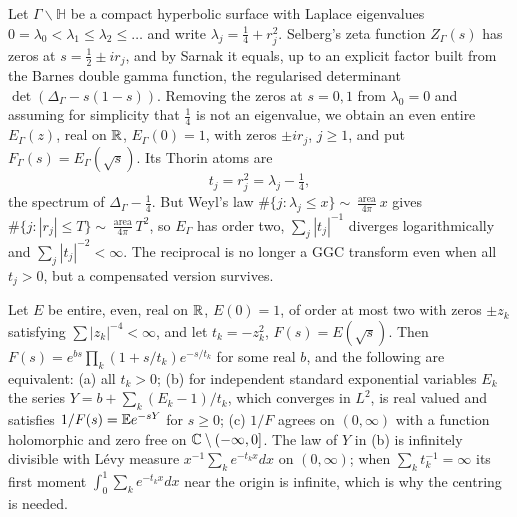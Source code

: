 Let $\Gamma\backslash\mathbb H$ be a compact hyperbolic surface with Laplace eigenvalues $0 = \lambda_0<\lambda_1\le\lambda_2\le\dots$ and write $\lambda_j = \frac14+r_j^2$. Selberg's zeta function $Z_\Gamma(s)$ \cite{selberg1956,hejhal1976} has zeros at $s = \frac12\pm ir_j$, and by Sarnak \cite{sarnak1987b} it equals, up to an explicit factor built from the Barnes double gamma function, the regularised determinant $\det(\Delta_\Gamma-s(1-s))$. Removing the zeros at $s=0,1$ from $\lambda_0 = 0$ and assuming for simplicity that $\frac14$ is not an eigenvalue, we obtain an even entire $E_\Gamma(z)$, real on $\mathbb{R}$, $E_\Gamma(0) = 1$, with zeros $\pm ir_j$, $j\ge1$, and put $F_\Gamma(s) = E_\Gamma(\sqrt s)$. Its Thorin atoms are
\[
t_j = r_j^2 = \lambda_j-\tfrac14,
\]
the spectrum of $\Delta_\Gamma-\frac14$. But Weyl's law $\#\{j:\lambda_j\le x\}\sim\frac{\operatorname{area}}{4\pi}x$ \cite{weyl1912,hejhal1976} gives $\#\{j:|r_j|\le T\}\sim\frac{\operatorname{area}}{4\pi}T^2$, so $E_\Gamma$ has order two, $\sum_j|t_j|^{-1}$ diverges logarithmically and $\sum_j|t_j|^{-2}<\infty$. The reciprocal is no longer a GGC transform even when all $t_j>0$, but a compensated version survives.

\begin{proposition}\label{prop:10bregularised}
Let $E$ be entire, even, real on $\mathbb{R}$, $E(0)=1$, of order at most two with zeros $\pm z_k$ satisfying $\sum|z_k|^{-4}<\infty$, and let $t_k = -z_k^2$, $F(s) = E(\sqrt s)$. Then $F(s) = e^{bs}\prod_k(1+s/t_k)e^{-s/t_k}$ for some real $b$, and the following are equivalent: (a) all $t_k>0$; (b) for independent standard exponential variables $E_k$ the series $Y = b+\sum_k(E_k-1)/t_k$, which converges in $L^2$, is real valued and satisfies $1/F(s) = \mathbb{E} e^{-sY}$ for $s\ge0$; (c) $1/F$ agrees on $(0,\infty)$ with a function holomorphic and zero free on $\mathbb{C}\setminus(-\infty,0]$. The law of $Y$ in (b) is infinitely divisible with L\'evy measure $x^{-1}\sum_ke^{-t_kx}dx$ on $(0,\infty)$; when $\sum_kt_k^{-1} = \infty$ its first moment $\int_0^1\sum_ke^{-t_kx}dx$ near the origin is infinite, which is why the centring is needed.
\end{proposition}

